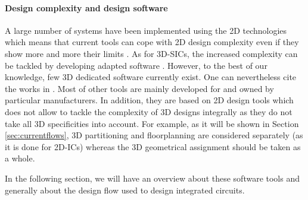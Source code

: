 \paragraph{Design complexity and design software}
A large number of systems have been implemented using the 2D technologies which means that current tools can cope with 2D design complexity even if they show more and more their limits \cite{vanderbiest06, PFF10}. As for 3D-SICs, the increased complexity can be tackled by developing adapted software \cite{659500}. However, to the best of our knowledge, few 3D dedicated software currently exist. One can nevertheless cite the works in \cite{1112292,1594713,Xie:2006:DSE:1148015.1148016,4735042}. Most of other tools are mainly developed for and owned by particular manufacturers. In addition, they are based on 2D design tools which does not allow to tackle the complexity of 3D designs integrally as they do not take all 3D specificities into account. For example, as it will be shown in Section \ref{sec:currentflows}, 3D partitioning and floorplanning are considered separately (as it is done for 2D-ICs) whereas the 3D geometrical assignment should be taken as a whole.

In the following section, we will have an overview about these software tools and generally about the design flow used to design integrated circuits.

%
%
%

